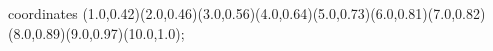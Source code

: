 					coordinates { (1.0,0.42)(2.0,0.46)(3.0,0.56)(4.0,0.64)(5.0,0.73)(6.0,0.81)(7.0,0.82)(8.0,0.89)(9.0,0.97)(10.0,1.0)};